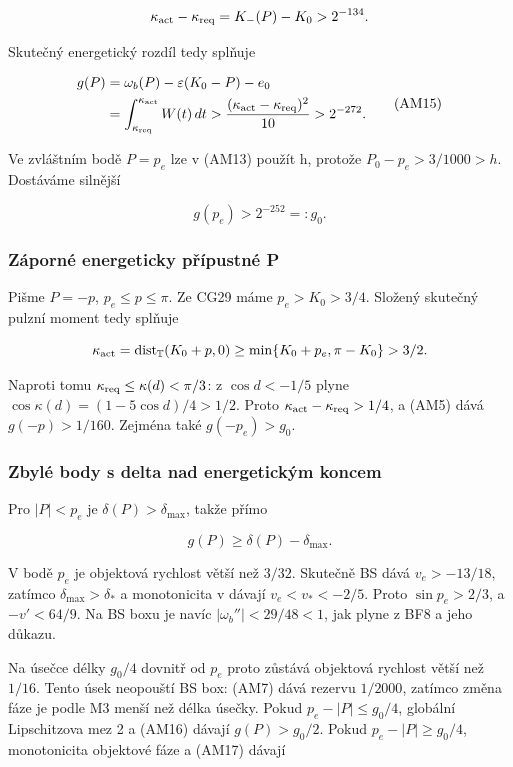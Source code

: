 \documentclass[11pt,a4paper]{article}
\theoremstyle{remark}\newtheorem{remark}[theorem]{Poznámka}
\numberwithin{equation}{section}
\begin{document}
\[
\kappa_{\rm act}-\kappa_{\rm req}
=K_-(P)-K_0>2^{-134}.
\]

Skutečný energetický rozdíl tedy splňuje

\[
\begin{aligned}
g(P)&=\omega_b(P)-\varepsilon(K_0-P)-e_0\\
&=\int_{\kappa_{\rm req}}^{\kappa_{\rm act}}W(t)\,dt
>\frac{(\kappa_{\rm act}-\kappa_{\rm req})^2}{10}
>2^{-272}.
\end{aligned}
\tag{AM15}
\]

Ve zvláštním bodě \(P=p_e\) lze v (AM13) použít h, protože
\(P_0-p_e>3/1000>h\). Dostáváme silnější

\[
g(p_e)>2^{-252}=:g_0.
\tag{AM16}
\]

\hypertarget{zuxe1pornuxe9-energeticky-pux159uxedpustnuxe9-p}{%
\subsubsection{Záporné energeticky přípustné
P}\label{zuxe1pornuxe9-energeticky-pux159uxedpustnuxe9-p}}

Pišme \(P=-p\), \(p_e\le p\le\pi\). Ze CG29 máme \(p_e>K_0>3/4\).
Složený skutečný pulzní moment tedy splňuje

\[
\kappa_{\rm act}
=\operatorname{dist}_{\mathbb T}(K_0+p,0)
\ge\min\{K_0+p_e,\pi-K_0\}>3/2.
\]

Naproti tomu \(\kappa_{\rm req}\le\kappa(d)<\pi/3\): z \(\cos d<-1/5\)
plyne \(\cos\kappa(d)=(1-5\cos d)/4>1/2\). Proto
\(\kappa_{\rm act}-\kappa_{\rm req}>1/4\), a (AM5) dává \(g(-p)>1/160\).
Zejména také \(g(-p_e)>g_0\).

\hypertarget{zbyluxe9-body-s-delta-nad-energetickuxfdm-koncem}{%
\subsubsection{Zbylé body s delta nad energetickým
koncem}\label{zbyluxe9-body-s-delta-nad-energetickuxfdm-koncem}}

Pro \(|P|<p_e\) je \(\delta(P)>\delta_{\max}\), takže přímo

\[
g(P)\ge\delta(P)-\delta_{\max}.
\tag{AM17}
\]

V bodě \(p_e\) je objektová rychlost větší než \(3/32\). Skutečně BS
dává \(v_e>-13/18\), zatímco \(\delta_{\max}>\delta_*\) a monotonicita v
dávají \(v_e<v_*<-2/5\). Proto \(\sin p_e>2/3\), a \(-v'<64/9\). Na BS
boxu je navíc \(|\omega_b''|<29/48<1\), jak plyne z BF8 a jeho důkazu.

Na úsečce délky \(g_0/4\) dovnitř od \(p_e\) proto zůstává objektová
rychlost větší než \(1/16\). Tento úsek neopouští BS box: (AM7) dává
rezervu \(1/2000\), zatímco změna fáze je podle M3 menší než délka
úsečky. Pokud \(p_e-|P|\le g_0/4\), globální Lipschitzova mez 2 a (AM16)
dávají \(g(P)>g_0/2\). Pokud \(p_e-|P|\ge g_0/4\), monotonicita
objektové fáze a (AM17) dávají
\end{document}
